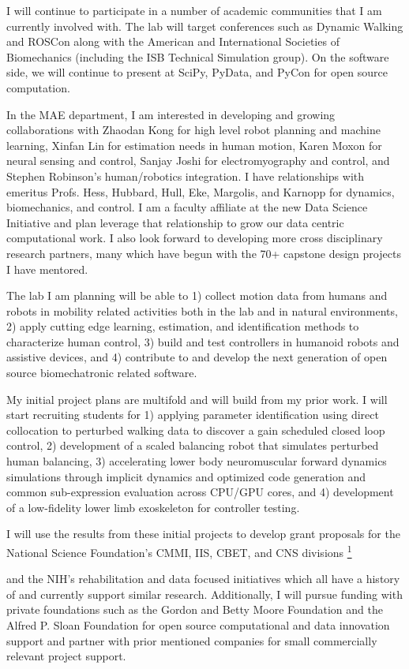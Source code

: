 \documentclass[letter,titlepage]{article}
\providecommand*{\DUfootnotemark}[3]{%
  \raisebox{1em}{\hypertarget{#1}{}}%
  \hyperlink{#2}{\textsuperscript{#3}}%
}
\begin{document}
I will continue to participate in a number of academic communities that I am
currently involved with. The lab will target conferences such as Dynamic
Walking and ROSCon along with the American and International Societies of
Biomechanics (including the ISB Technical Simulation group). On the software
side, we will continue to present at SciPy, PyData, and PyCon for open source
computation.

In the MAE department, I am interested in developing and growing collaborations
with Zhaodan Kong for high level robot planning and machine learning, Xinfan
Lin for estimation needs in human motion, Karen Moxon for neural sensing and
control, Sanjay Joshi for electromyography and control, and Stephen Robinson's
human/robotics integration. I have relationships with emeritus Profs. Hess,
Hubbard, Hull, Eke, Margolis, and Karnopp for dynamics, biomechanics, and
control. I am a faculty affiliate at the new Data Science Initiative and plan
leverage that relationship to grow our data centric computational work. I also
look forward to developing more cross disciplinary research partners, many which
have begun with the 70+ capstone design projects I have mentored.

The lab I am planning will be able to 1) collect motion data from humans and
robots in mobility related activities both in the lab and in natural
environments, 2) apply cutting edge learning, estimation, and identification
methods to characterize human control, 3) build and test controllers in
humanoid robots and assistive devices, and 4) contribute to and develop the
next generation of open source biomechatronic related software.

My initial project plans are multifold and will build from my prior work. I
will start recruiting students for 1) applying parameter identification using
direct collocation to perturbed walking data to discover a gain scheduled
closed loop control, 2) development of a scaled balancing robot that simulates
perturbed human balancing, 3) accelerating lower body neuromuscular forward
dynamics simulations through implicit dynamics and optimized code generation
and common sub-expression evaluation across CPU/GPU cores, and 4) development
of a low-fidelity lower limb exoskeleton for controller testing.

I will use the results from these initial projects to develop grant proposals
for the National Science Foundation's CMMI, IIS, CBET, and CNS divisions\DUfootnotemark{id53}{id54}{1}
and the NIH's rehabilitation and data focused initiatives which all have a
history of and currently support similar research. Additionally, I will pursue
funding with private foundations such as the Gordon and Betty Moore Foundation
and the Alfred P. Sloan Foundation for open source computational and data
innovation support and partner with prior mentioned companies for small
commercially relevant project support.
\end{document}
